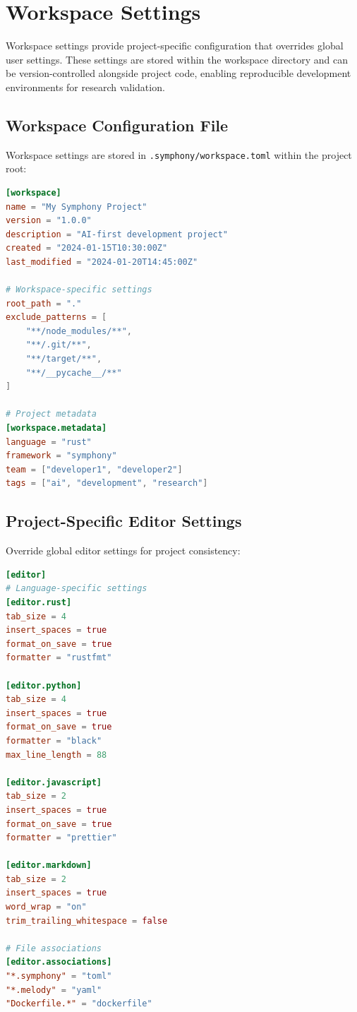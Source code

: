 \section*{Workspace Settings}

Workspace settings provide project-specific configuration that overrides global user settings. These settings are stored within the workspace directory and can be version-controlled alongside project code, enabling reproducible development environments for research validation.

\subsection*{Workspace Configuration File}

Workspace settings are stored in \texttt{.symphony/workspace.toml} within the project root:

\begin{lstlisting}[language=toml,caption={Workspace Configuration Structure}]
[workspace]
name = "My Symphony Project"
version = "1.0.0"
description = "AI-first development project"
created = "2024-01-15T10:30:00Z"
last_modified = "2024-01-20T14:45:00Z"

# Workspace-specific settings
root_path = "."
exclude_patterns = [
    "**/node_modules/**",
    "**/.git/**",
    "**/target/**",
    "**/__pycache__/**"
]

# Project metadata
[workspace.metadata]
language = "rust"
framework = "symphony"
team = ["developer1", "developer2"]
tags = ["ai", "development", "research"]
\end{lstlisting}

\subsection*{Project-Specific Editor Settings}

Override global editor settings for project consistency:

\begin{lstlisting}[language=toml,caption={Project Editor Configuration}]
[editor]
# Language-specific settings
[editor.rust]
tab_size = 4
insert_spaces = true
format_on_save = true
formatter = "rustfmt"

[editor.python]
tab_size = 4
insert_spaces = true
format_on_save = true
formatter = "black"
max_line_length = 88

[editor.javascript]
tab_size = 2
insert_spaces = true
format_on_save = true
formatter = "prettier"

[editor.markdown]
tab_size = 2
insert_spaces = true
word_wrap = "on"
trim_trailing_whitespace = false

# File associations
[editor.associations]
"*.symphony" = "toml"
"*.melody" = "yaml"
"Dockerfile.*" = "dockerfile"
\end{lstlisting}


